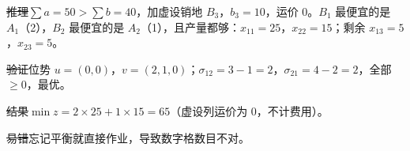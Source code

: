 \begin{center}\end{center}
\st{推理}$\sum a=50>\sum b=40$，加虚设销地 $B_3$，$b_3=10$，运价 0。$B_1$ 最便宜的是 $A_1$（2），$B_2$ 最便宜的是 $A_2$（1），且产量都够：$x_{11}=25$，$x_{22}=15$；剩余 $x_{13}=5$，$x_{23}=5$。\par
\st{验证}位势 $u=(0,0)$，$v=(2,1,0)$；$\sigma_{12}=3-1=2$，$\sigma_{21}=4-2=2$，全部 $\ge0$，最优。\par
\st{结果}$\min z=2\times25+1\times15=65$（虚设列运价为 0，不计费用）。\par
\st{易错}忘记平衡就直接作业，导致数字格数目不对。

